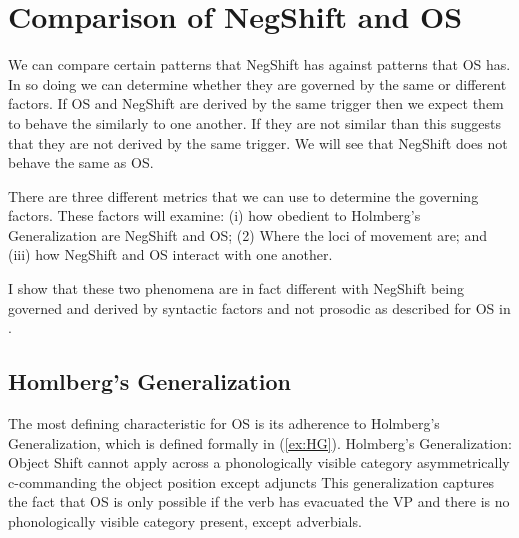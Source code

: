 \documentclass[12pt, letterpaper]{article}
\begin{document}
\section{Comparison of NegShift and OS} \label{sec:NEG-OS}
We can compare certain patterns that NegShift has against patterns that OS has. In so doing we can determine whether they are governed by the same or different factors. If OS and NegShift are derived by the same trigger then we expect them to behave the similarly to one another. If they are not similar than this suggests that they are not derived by the same trigger. We will see that NegShift does not behave the same as OS.

There are three different metrics that we can use to determine the governing factors. These factors will examine: (i) how obedient to Holmberg's Generalization are NegShift and OS; (2) Where the loci of movement are; and (iii) how NegShift and OS interact with one another.   

I show that these two phenomena are in fact different with NegShift being governed and derived by syntactic factors and not prosodic as described for OS in \citet{erteschik-shirSoundPatternsSyntax2005,erteschik-shirScandinavianObjectShift2017,erteschik-shirVariationMainlandScandinavian2020,brinkerhoffMATCHINGPhrasesNorwegian2021}.  

\subsection{Homlberg's Generalization} \label{sec:HG}

The most defining characteristic for OS is its adherence to Holmberg's Generalization, which is defined formally in (\ref{ex:HG}).  
\ea \label{ex:HG} {Holmberg's Generalization:\\
Object Shift cannot apply across a phonologically visible category asymmetrically c-commanding the object position except adjuncts} 
\z
This generalization captures the fact that OS is only possible if the verb has evacuated the VP and there is no phonologically visible category present, except adverbials. 
\end{document}
